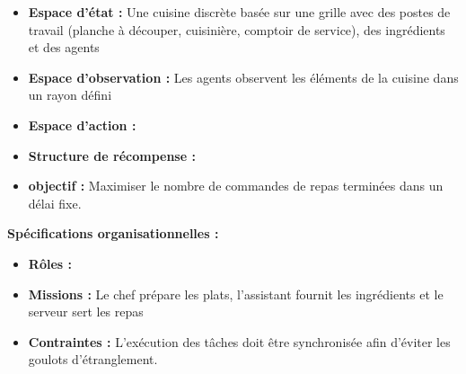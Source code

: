 \begin{itemize}
  \item \textbf{Espace d'état :} Une cuisine discrète basée sur une grille avec des postes de travail (planche à découper, cuisinière, comptoir de service), des ingrédients et des agents
  \item \textbf{Espace d'observation :} Les agents observent les éléments de la cuisine dans un rayon défini
  \item \textbf{Espace d'action :}
  \item \textbf{Structure de récompense :}
  \item \textbf{objectif :} Maximiser le nombre de commandes de repas terminées dans un délai fixe.
\end{itemize}
%
\textbf{Spécifications organisationnelles :}
\begin{itemize}
  \item \textbf{Rôles :} 
  \item \textbf{Missions :} Le chef prépare les plats, l'assistant fournit les ingrédients et le serveur sert les repas
  \item \textbf{Contraintes :} L'exécution des tâches doit être synchronisée afin d'éviter les goulots d'étranglement.
\end{itemize}

